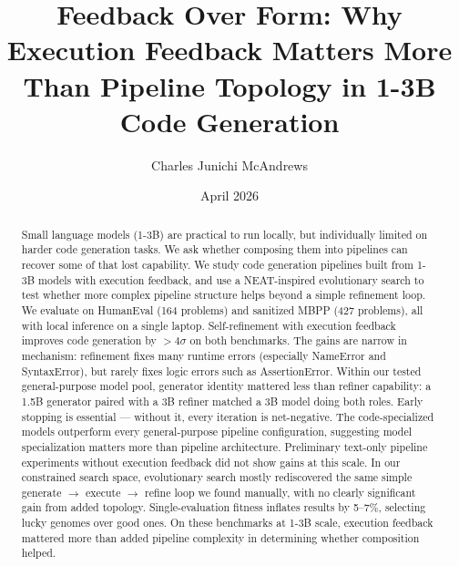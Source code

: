 \documentclass{article}
\title{Feedback Over Form: Why Execution Feedback Matters More Than Pipeline Topology in 1-3B Code Generation}
\author{Charles Junichi McAndrews}
\date{April 2026}
\begin{document}
\maketitle

\begin{abstract}
    Small language models (1-3B) are practical to run locally, but individually limited on harder code generation tasks. We ask whether composing them into pipelines can recover some of that lost capability. We study code generation pipelines built from 1-3B models with execution feedback, and use a NEAT-inspired evolutionary search to test whether more complex pipeline structure helps beyond a simple refinement loop. We evaluate on HumanEval (164 problems) and sanitized MBPP (427 problems), all with local inference on a single laptop. Self-refinement with execution feedback improves code generation by $>4\sigma$ on both benchmarks. The gains are narrow in mechanism: refinement fixes many runtime errors (especially NameError and SyntaxError), but rarely fixes logic errors such as AssertionError. Within our tested general-purpose model pool, generator identity mattered less than refiner capability: a 1.5B generator paired with a 3B refiner matched a 3B model doing both roles. Early stopping is essential --- without it, every iteration is net-negative. The code-specialized models outperform every general-purpose pipeline configuration, suggesting model specialization matters more than pipeline architecture. Preliminary text-only pipeline experiments without execution feedback did not show gains at this scale. In our constrained search space, evolutionary search mostly rediscovered the same simple generate $\rightarrow$ execute $\rightarrow$ refine loop we found manually, with no clearly significant gain from added topology. Single-evaluation fitness inflates results by 5--7\%, selecting lucky genomes over good ones. On these benchmarks at 1-3B scale, execution feedback mattered more than added pipeline complexity in determining whether composition helped.
\end{abstract}
\end{document}
